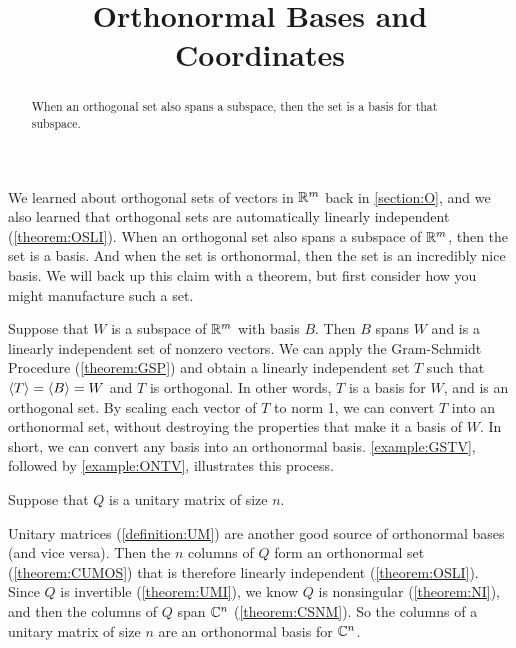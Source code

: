 \documentclass{ximera}
\title{Orthonormal Bases and Coordinates}
\begin{document}
\begin{abstract}
  When an orthogonal set also spans a subspace, then the set is a
  basis for that subspace.
\end{abstract}
\maketitle

We learned about orthogonal sets of vectors in $\mathbb{R}^{m}$ back in
\ref{section:O}, and we also learned that orthogonal sets are
automatically linearly independent (\ref{theorem:OSLI}).  When an
orthogonal set also spans a subspace of $\mathbb{R}^{m}$, then the set is a
basis.  And when the set is orthonormal, then the set is an incredibly
nice basis.  We will back up this claim with a theorem, but first
consider how you might manufacture such a set.

Suppose that $W$ is a subspace of $\mathbb{R}^{m}$ with basis $B$.  Then $B$
spans $W$ and is a linearly independent set of nonzero vectors.  We
can apply the Gram-Schmidt Procedure (\ref{theorem:GSP}) and obtain a
linearly independent set $T$ such that $\left\langle T\right\rangle=\left\langle B\right\rangle=W$ and $T$ is
orthogonal.  In other words, $T$ is a basis for $W$, and is an
orthogonal set.  By scaling each vector of $T$ to norm 1, we can
convert $T$ into an orthonormal set, without destroying the properties
that make it a basis of $W$.  In short, we can convert any basis into
an orthonormal basis.  \ref{example:GSTV}, followed by
\ref{example:ONTV}, illustrates this process.

\begin{question}
  Suppose that $Q$ is a unitary matrix of size $n$.

  \begin{multipleChoice}
  \end{multipleChoice}

  \begin{feedback}[correct]
    Unitary matrices (\ref{definition:UM}) are another good source of
    orthonormal bases (and vice versa).  Then the $n$ columns of $Q$
    form an orthonormal set (\ref{theorem:CUMOS}) that is therefore
    linearly independent (\ref{theorem:OSLI}).  Since $Q$ is
    invertible (\ref{theorem:UMI}), we know $Q$ is nonsingular
    (\ref{theorem:NI}), and then the columns of $Q$ span $\mathbb{C}^{n}$
    (\ref{theorem:CSNM}).  So the columns of a unitary matrix of size
    $n$ are an orthonormal basis for $\mathbb{C}^{n}$.
  \end{feedback}
\end{question}
\end{document}
